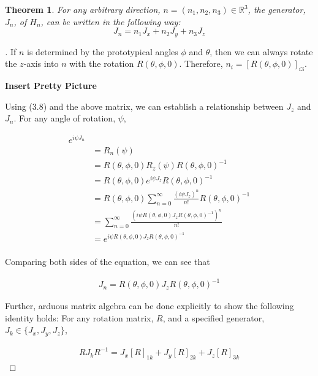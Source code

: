 \documentclass[10pt]{ucthesis}
\newcommand{\R}{\mathbb{R}}
\newtheorem{theorem}[definition]{Theorem}
\begin{document}
\begin{theorem}
	 For any arbitrary direction, $n=(n_1,n_2,n_3)\in\R^3$, the generator, $J_n$, of $H_n$, can be written in the following way:
$$J_n = n_1J_x + n_2J_y + n_3J_z$$
\end{theorem}
\noindent \begin{proof}[\cite{Tung}] If $n$ is determined by the prototypical angles $\phi$ and $\theta$, then we can always rotate the $z$-axis into $n$ with the rotation $R(\theta,\phi,0)$. Therefore, $n_i = [R(\theta,\phi,0)]_{i3}$.

\textbf{Insert Pretty Picture}

Using (3.8) and the above matrix, we can establish a relationship between $J_z$ and $J_n$. For any angle of rotation, $\psi$,

\begin{equation}
	\begin{aligned}
		e^{i\psi J_n} \\
							&= R_n(\psi)	\\
							&=R(\theta,\phi,0)R_z(\psi)R(\theta,\phi,0)^{-1}\\
							&=R(\theta,\phi,0) e^{i\psi J_z} R(\theta,\phi,0)^{-1}\\ 
							&= R(\theta,\phi,0) \sum_{n=0}^\infty \frac{(i\psi J_z)^n}{n!} R(\theta,\phi,0)^{-1} \\
							&= \sum_{n=0}^\infty \frac{(i\psi R(\theta,\phi,0)J_zR(\theta,\phi,0)^{-1})^n}{n!} \\
							&= e^{i\psi R(\theta,\phi,0)J_z R(\theta,\phi,0)^{-1}}\\
	\end{aligned}
\end{equation}

Comparing both sides of the equation, we can see that 

\begin{equation}
	\begin{aligned}
		J_n = R(\theta,\phi,0)J_z R(\theta,\phi,0)^{-1}
	\end{aligned}
\end{equation}

Further, arduous matrix algebra can be done explicitly to show the following identity holds: For any rotation matrix, $R$, and a specified generator, $J_k\in\{J_x,J_y,J_z\}$,

\begin{equation}
	\begin{aligned}
		RJ_kR^{-1} = J_x [R]_{1k} + J_y  [R]_{2k}  +J_z  [R]_{3k} 
	\end{aligned}
\end{equation}


\end{proof}
\end{document}
